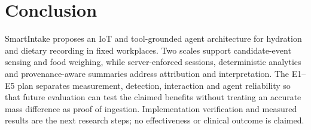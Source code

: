 \documentclass[conference]{IEEEtran}
\newcommand{\sys}{SmartIntake}
\providecommand{\DIFaddend}{} %
\begin{document}
\DIFaddend \section{Conclusion}\label{sec:conclusion}
\sys{} proposes an IoT and tool-grounded agent architecture for hydration and dietary recording in fixed workplaces. Two scales support candidate-event sensing and food weighing, while server-enforced sessions, deterministic analytics and provenance-aware summaries address attribution and interpretation. The E1--E5 plan separates measurement, detection, interaction and agent reliability so that future evaluation can test the claimed benefits without treating an accurate mass difference as proof of ingestion. Implementation verification and measured results are the next research steps; no effectiveness or clinical outcome is claimed.
\end{document}
